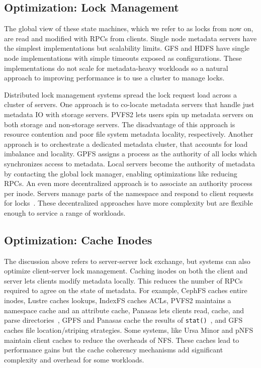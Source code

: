 \subsection{Optimization: Lock Management}

The global view of these state machines, which we refer to as locks from now
on, are read and modified with RPCs from clients.  Single node metadata
servers have the simplest implementations but scalability limits. GFS and HDFS
have single node implementations with simple timeouts exposed as
configurations. These implementations do not scale for metadata-heavy workloads
so a natural approach to improving performance is to use a cluster to manage
locks.

Distributed lock management systems spread the lock request load across a
cluster of servers. One approach is to co-locate metadata servers that
handle just metadata IO with storage servers. PVFS2 lets users spin up metadata
servers on both storage and non-storage servers. The disadvantage of this
approach is resource contention and poor file system metadata locality,
respectively. Another approach is to orchestrate a dedicated metadata cluster,
that accounts for load imbalance and locality. GPFS assigns a process as the
authority of all locks which synchronizes access to metadata. Local servers
become the authority of metadata by contacting the global lock manager,
enabling optimizations like reducing RPCs. An even more decentralized approach
is to associate an authority process per inode. Servers manage parts of the
namespace and respond to client requests for locks~\cite{wang:tech09-lustre,
ren:sc2014-indexfs, weil:sc2004-dyn-metadata, welch:fast08-panasas}.  These
decentralized approaches have more complexity but are flexible enough to
service a range of workloads.

\subsection{Optimization: Cache Inodes}

The discussion above refers to server-server lock exchange, but systems can
also optimize client-server lock management. Caching inodes on both the client
and server lets clients modify metadata locally.  This reduces the number of
RPCs required to agree on the state of metadata.  For example, CephFS caches
entire inodes, Lustre caches lookups, IndexFS caches ACLs, PVFS2 maintains a
namespace cache and an attribute cache, Panasas lets clients read, cache, and
parse directories~\cite{welch:fast08-panasas}, GPFS and Panasas cache the
results of \texttt{stat()}~\cite{docs:cephcaps, schmuck:fast2002-gpfs,
wang:tech09-lustre, depardon:tech13-survey}, and GFS caches file
location/striping strategies.  Some systems, like Ursa Minor and pNFS maintain
client caches to reduce the overheads of NFS. These caches lead to performance
gains but the cache coherency mechanisms add significant complexity and
overhead for some workloads.

